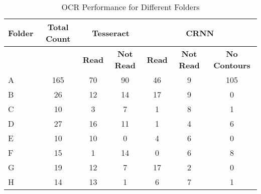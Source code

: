 \begin{table}[h]
    \centering
    \caption{OCR Performance for Different Folders}
    \label{tab:ocr_performance}
    \begin{tabular}{|l|c|c|c|c|c|c|}
        \hline
        \textbf{Folder} & \textbf{Total Count} & \multicolumn{2}{c|}{\textbf{Tesseract}} & \multicolumn{3}{c|}{\textbf{CRNN}}                                                            \\
        \hline
                        &                      & \textbf{Read}                           & \textbf{Not Read}                  & \textbf{Read} & \textbf{Not Read} & \textbf{No Contours} \\
        \hline
        A               & 165                  & 70                                      & 90                                 & 46            & 9                 & 105                  \\
        B               & 26                   & 12                                      & 14                                 & 17            & 9                 & 0                    \\
        C               & 10                   & 3                                       & 7                                  & 1             & 8                 & 1                    \\
        D               & 27                   & 16                                      & 11                                 & 1             & 4                 & 6                    \\
        E               & 10                   & 10                                      & 0                                  & 4             & 6                 & 0                    \\
        F               & 15                   & 1                                       & 14                                 & 0             & 6                 & 8                    \\
        G               & 19                   & 12                                      & 7                                  & 17            & 2                 & 0                    \\
        H               & 14                   & 13                                      & 1                                  & 6             & 7                 & 1                    \\
        \hline
    \end{tabular}
\end{table}

